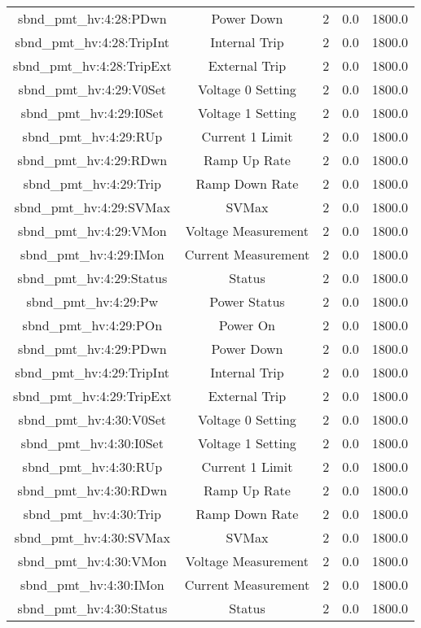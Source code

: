 \begin{table}[ptb]
\begin{tabular}{c | c c c c}
sbnd_pmt_hv:4:28:PDwn & Power Down & 2 & 0.0 & 1800.0\\ 
sbnd_pmt_hv:4:28:TripInt & Internal Trip & 2 & 0.0 & 1800.0\\ 
sbnd_pmt_hv:4:28:TripExt & External Trip & 2 & 0.0 & 1800.0\\ 
sbnd_pmt_hv:4:29:V0Set & Voltage 0 Setting & 2 & 0.0 & 1800.0\\ 
sbnd_pmt_hv:4:29:I0Set & Voltage 1 Setting & 2 & 0.0 & 1800.0\\ 
sbnd_pmt_hv:4:29:RUp & Current 1 Limit & 2 & 0.0 & 1800.0\\ 
sbnd_pmt_hv:4:29:RDwn & Ramp Up Rate & 2 & 0.0 & 1800.0\\ 
sbnd_pmt_hv:4:29:Trip & Ramp Down Rate & 2 & 0.0 & 1800.0\\ 
sbnd_pmt_hv:4:29:SVMax & SVMax & 2 & 0.0 & 1800.0\\ 
sbnd_pmt_hv:4:29:VMon & Voltage Measurement & 2 & 0.0 & 1800.0\\ 
sbnd_pmt_hv:4:29:IMon & Current Measurement & 2 & 0.0 & 1800.0\\ 
sbnd_pmt_hv:4:29:Status & Status & 2 & 0.0 & 1800.0\\ 
sbnd_pmt_hv:4:29:Pw & Power Status & 2 & 0.0 & 1800.0\\ 
sbnd_pmt_hv:4:29:POn & Power On & 2 & 0.0 & 1800.0\\ 
sbnd_pmt_hv:4:29:PDwn & Power Down & 2 & 0.0 & 1800.0\\ 
sbnd_pmt_hv:4:29:TripInt & Internal Trip & 2 & 0.0 & 1800.0\\ 
sbnd_pmt_hv:4:29:TripExt & External Trip & 2 & 0.0 & 1800.0\\ 
sbnd_pmt_hv:4:30:V0Set & Voltage 0 Setting & 2 & 0.0 & 1800.0\\ 
sbnd_pmt_hv:4:30:I0Set & Voltage 1 Setting & 2 & 0.0 & 1800.0\\ 
sbnd_pmt_hv:4:30:RUp & Current 1 Limit & 2 & 0.0 & 1800.0\\ 
sbnd_pmt_hv:4:30:RDwn & Ramp Up Rate & 2 & 0.0 & 1800.0\\ 
sbnd_pmt_hv:4:30:Trip & Ramp Down Rate & 2 & 0.0 & 1800.0\\ 
sbnd_pmt_hv:4:30:SVMax & SVMax & 2 & 0.0 & 1800.0\\ 
sbnd_pmt_hv:4:30:VMon & Voltage Measurement & 2 & 0.0 & 1800.0\\ 
sbnd_pmt_hv:4:30:IMon & Current Measurement & 2 & 0.0 & 1800.0\\ 
sbnd_pmt_hv:4:30:Status & Status & 2 & 0.0 & 1800.0\\ 

\end{tabular}
\end{table}
